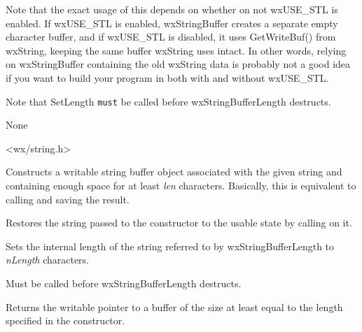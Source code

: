 Note that the exact usage of this depends on whether on not wxUSE\_STL is enabled.  If
wxUSE\_STL is enabled, wxStringBuffer creates a separate empty character buffer, and
if wxUSE\_STL is disabled, it uses GetWriteBuf() from wxString, keeping the same buffer
wxString uses intact.  In other words, relying on wxStringBuffer containing the old 
wxString data is probably not a good idea if you want to build your program in both
with and without wxUSE\_STL.

Note that SetLength {\tt must} be called before wxStringBufferLength destructs.


None


<wx/string.h>



\label{wxstringbufferlengthctor}


Constructs a writable string buffer object associated with the given string
and containing enough space for at least {\it len} characters. Basically, this
is equivalent to calling  and
saving the result.


\label{wxstringbufferlengthdtor}


Restores the string passed to the constructor to the usable state by calling 
 on it.


\label{wxstringbufferlengthsetlength}


Sets the internal length of the string referred to by wxStringBufferLength to 
{\it nLength} characters.

Must be called before wxStringBufferLength destructs.


\label{wxstringbufferlengthwxchar}


Returns the writable pointer to a buffer of the size at least equal to the
length specified in the constructor.


